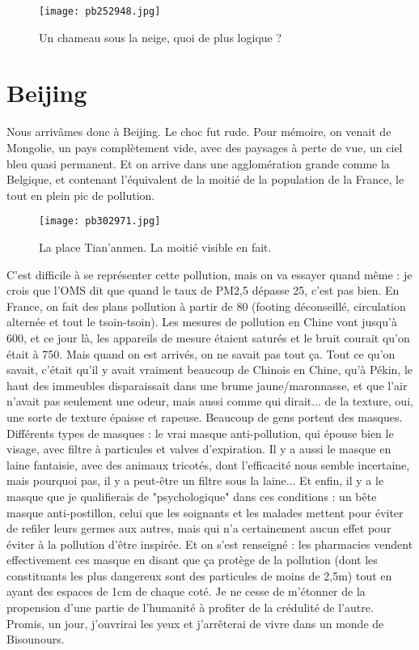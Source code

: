 \documentclass{book}
\begin{document}
\begin{figure}[h]
\centering
\texttt{[image: pb252948.jpg]}
\caption*{ Un chameau sous la neige, quoi de plus logique ?}
\end{figure}



\chapter{Beijing}
Nous arrivâmes donc à Beijing. Le choc fut rude. Pour mémoire, on venait de Mongolie, un pays complètement vide, avec des paysages à perte de vue, un ciel bleu quasi permanent. Et on arrive dans une agglomération grande comme la Belgique, et contenant l'équivalent de la moitié de la population de la France, le tout en plein pic de pollution.


\begin{figure}[h]
\centering
\texttt{[image: pb302971.jpg]}
\caption*{ La place Tian'anmen. La moitié visible en fait.}
\end{figure}

C'est difficile à se représenter cette pollution, mais on va essayer quand même : je crois que l'OMS dit que quand le taux de PM2,5 dépasse 25, c'est pas bien. En France, on fait des plans pollution à partir de 80 (footing déconseillé, circulation alternée et tout le tsoin-tsoin). Les mesures de pollution en Chine vont jusqu'à 600, et ce jour là, les appareils de mesure étaient saturés et le bruit courait qu'on était à 750. Mais quand on est arrivés, on ne savait pas tout ça. Tout ce qu'on savait, c'était qu'il y avait vraiment beaucoup de Chinois en Chine, qu'à Pékin, le haut des immeubles disparaissait dans une brume jaune/maronnasse, et que l'air n'avait pas seulement une odeur, mais aussi comme qui dirait... de la texture, oui, une sorte de texture épaisse et rapeuse. Beaucoup de gens portent des masques. Différents types de masques : le vrai masque anti-pollution, qui épouse bien le visage, avec filtre à particules et valves d'expiration. Il y a aussi le masque en laine fantaisie, avec des animaux tricotés, dont l'efficacité nous semble incertaine, mais pourquoi pas, il y a peut-être un filtre sous la laine... Et enfin, il y a le masque que je qualifierais de "psychologique" dans ces conditions : un bête masque anti-postillon, celui que les soignants et les malades mettent pour éviter de refiler leurs germes aux autres, mais qui n'a certainement aucun effet pour éviter à la pollution d'être inspirée. Et on s'est renseigné : les pharmacies vendent effectivement ces masque en disant que ça protège de la pollution (dont les constituants les plus dangereux sont des particules de moins de 2,5\textmu{}m) tout en ayant des espaces de 1cm de chaque coté. Je ne cesse de m'étonner de la propension d'une partie de l'humanité à profiter de la crédulité de l'autre. Promis, un jour, j'ouvrirai les yeux et j'arrêterai de vivre dans un monde de Bisounours.
\end{document}
